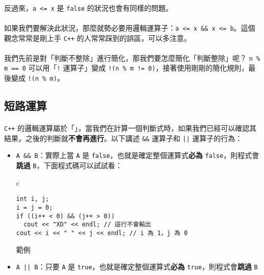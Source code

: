 \documentclass[12pt,a4paper,oneside]{report}
\begin{document}
\begin{CJK}{UTF8}{bkai}
\paragraph{}反過來，\lstinline!a <= x! 是 \lstinline!false! 的狀況也會有同樣的問題。
\paragraph{}如果我們要解決此狀況，那麼就勢必要用邏輯運算子：\lstinline!a <= x && x <= b!。這個觀念常常是剛上手 \texttt{C++} 的人常常踩到的誤區，可以多注意。

\paragraph{}我們先前是對「判斷不整除」進行簡化，那我們要怎麼簡化「判斷整除」呢？ \lstinline!n % m == 0! 可以用「\lstinline"!" 運算子」變成 \lstinline"!(n % m != 0)"，接著使用剛剛的簡化規則，最後變成 \lstinline"!(n % m)"。

\subsection{短路運算}

\paragraph{}\texttt{C++} 的邏輯運算屬於「」，當我們在計算一個判斷式時，如果我們已經可以確認其結果，之後的判斷就\textbf{不會再進行}。以下講述 \lstinline!&&! 運算子和 \lstinline!||! 運算子的行為：

\begin{itemize}
\item \lstinline!A && B!：實際上當 \lstinline!A! 是 \lstinline!false!，也就是確定整個運算式\textbf{必為} \lstinline!false!，則程式會\textbf{跳過} \lstinline!B!，下面程式碼可以試試看：

\begin{code}[h!]
\centering
\begin{tabular}{c}
\begin{lstlisting}
int i, j;
i = j = 0;
if ((i++ < 0) && (j++ > 0))
  cout << "XD" << endl; // 這行不會輸出
cout << i << " " << j << endl; // i 為 1，j 為 0
\end{lstlisting}
\end{tabular}
\caption{範例}
\label{basic:cpp:code:short:cut}
\end{code}

\item \lstinline!A || B!：只要 \lstinline!A! 是 \lstinline!true!，也就是確定整個運算式\textbf{必為} \lstinline!true!，則程式會\textbf{跳過} \lstinline!B!


\end{itemize}
\end{CJK}
\end{document}

